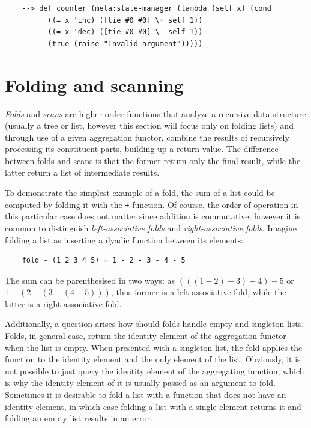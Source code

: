 \begin{Verbatim}
    --> def counter (meta:state-manager (lambda (self x) (cond
          ((= x 'inc) ([tie #0 #0] \+ self 1))
          ((= x 'dec) ([tie #0 #0] \- self 1))
          (true (raise "Invalid argument")))))
\end{Verbatim}

\section{Folding and scanning}

\textit{Folds} and \textit{scans} are higher-order functions that analyze a recursive data structure (usually a tree or list, however this section will focus only on folding lists) and through use of a given aggregation functor, combine the results of recursively processing its constituent parts, building up a return value. The difference between folds and scans is that the former return only the final result, while the latter return a list of intermediate results.

To demonstrate the simplest example of a fold, the sum of a list could be computed by folding it with the \verb|+| function. Of course, the order of operation in this particular case does not matter since addition is commutative, however it is common to distinguish \textit{left-associative folds} and \textit{right-associative folds}. Imagine folding a list as inserting a dyadic function between its elements:

\begin{Verbatim}
    fold - (1 2 3 4 5) = 1 - 2 - 3 - 4 - 5
\end{Verbatim}

The sum can be parenthesised in two ways: as $(((1 - 2) - 3) - 4) - 5$ or $1 - (2 - (3 - (4 - 5)))$, thus former is a left-associative fold, while the latter is a right-associative fold.

Additionally, a question arises how should folds handle empty and singleton lists. Folds, in general case, return the identity element of the aggregation functor when the list is empty. When presented with a singleton list, the fold applies the function to the identity element and the only element of the list. Obviously, it is not possible to just query the identity element of the aggregating function, which is why the identity element of it is usually passed as an argument to fold. Sometimes it is desirable to fold a list with a function that does not have an identity element, in which case folding a list with a single element returns it and folding an empty list results in an error.

